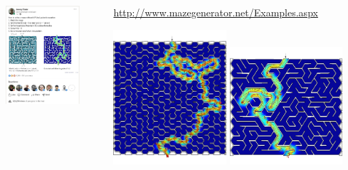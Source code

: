 \documentclass[
  ignorenonframetext,
  aspectratio=169,
]{beamer}
\begin{document}
\begin{frame}{}
\protect\hypertarget{section-5}{}
\begin{columns}[T]
\begin{column}{0.5\textwidth}
\centering \includegraphics[width=0.8\textwidth,height=\textheight]{maze-linkedin3.png}
\end{column}

\begin{column}{0.5\textwidth}
\url{http://www.mazegenerator.net/Examples.aspx}

\centering \includegraphics[width=0.45\textwidth,height=\textheight]{maze-sigma.png}
\centering \includegraphics[width=0.45\textwidth,height=\textheight]{maze-delta.png}


\end{column}
\end{columns}
\end{frame}
\end{document}
